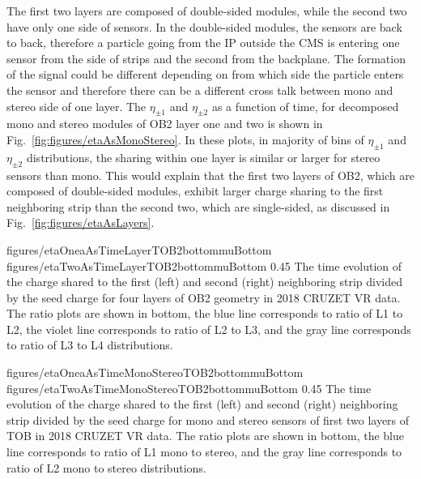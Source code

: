 The first two layers are composed of double-sided modules, while the second two have only one side of sensors. In the double-sided modules, the sensors are back to back, therefore a particle going from the IP outside the CMS is entering one sensor from the side of strips and the second from the backplane. The formation of the signal could be different depending on from which side the particle enters the sensor and therefore there can be a different cross talk between mono and stereo side of one layer. The $\eta_{\pm 1}$ and $\eta_{\pm 2}$ as a function of time, for decomposed mono and stereo modules of OB2 layer one and two is shown in Fig.~\ref{fig:figures/etaAsMonoStereo}. In these plots, in majority of bins of $\eta_{\pm 1}$ and $\eta_{\pm 2}$  distributions, the sharing within one layer is similar or larger for stereo sensors than mono. This would explain that the first two layers of OB2, which are composed of double-sided modules, exhibit larger charge sharing to the first neighboring strip than the second two, which are single-sided, as discussed in Fig.~\ref{fig:figures/etaAsLayers}. 



                 {figures/etaOneaAsTimeLayerTOB2bottommuBottom}
                 {figures/etaTwoAsTimeLayerTOB2bottommuBottom} %
                 {0.45}       %
                 { The time evolution of the charge shared to the first (left) and second (right) neighboring strip divided by the seed charge for four layers of OB2 geometry in 2018 CRUZET VR data. The ratio plots are shown in bottom, the blue line corresponds to ratio of L1 to L2, the violet line corresponds to ratio of L2 to L3, and the gray line corresponds to ratio of L3 to L4 distributions. }


                 {figures/etaOneaAsTimeMonoStereoTOB2bottommuBottom}
                 {figures/etaTwoAsTimeMonoStereoTOB2bottommuBottom} %
                 {0.45}       %
                 { The time evolution of the charge shared to the first (left) and second (right) neighboring strip divided by the seed charge for mono and stereo sensors of first two layers of TOB in 2018 CRUZET VR data. The ratio plots are shown in bottom, the blue line corresponds to ratio of L1 mono to stereo, and the gray line corresponds to ratio of L2 mono to stereo distributions. }


